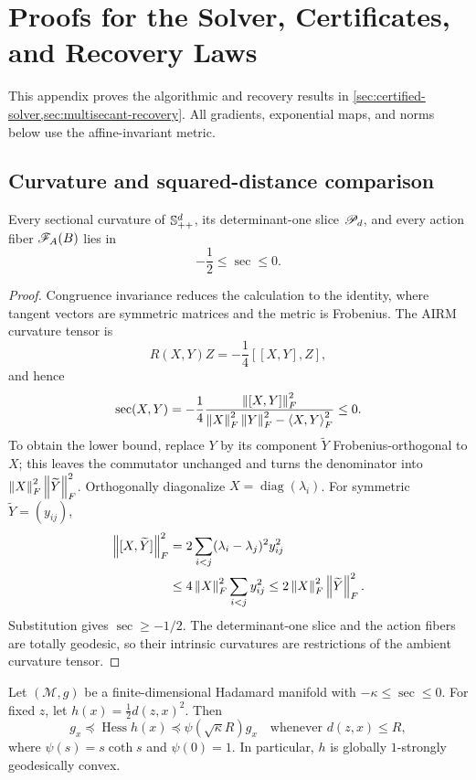 \section{Proofs for the Solver, Certificates, and Recovery Laws}
\label{app:solver-recovery-proofs}

This appendix proves the algorithmic and recovery results in
\cref{sec:certified-solver,sec:multisecant-recovery}.
All gradients, exponential maps, and norms below
use the affine-invariant metric.

\subsection{Curvature and squared-distance comparison}

\begin{lemma}
\label{lem:airm-curvature-bound}
Every sectional curvature of \(\mathbb{S}_{++}^d\), its determinant-one slice
\(\mathscr P_d\), and every action fiber \(\mathscr F_A(B)\) lies in
\begin{equation}
  -\frac12\le \operatorname{sec}\le0.
  \label{eq:airm-curvature-bound}
\end{equation}
\end{lemma}

\begin{proof}
Congruence invariance reduces the calculation to the identity, where tangent
vectors are symmetric matrices and the metric is Frobenius.  The AIRM
curvature tensor is
\[
  R(X,Y)Z=-\frac14[[X,Y],Z],
\]
and hence
\[
  \operatorname{sec}(X,Y)
  =-\frac14\frac{\left\lVert [X,Y]\right\rVert_F^2}
  {\left\lVert X\right\rVert_F^2\left\lVert Y\right\rVert_F^2-\left\langle X,Y\right\rangle_F^2}\le0.
\]
To obtain the lower bound, replace \(Y\) by its component
\(\widetilde Y\) Frobenius-orthogonal to \(X\); this leaves the commutator
unchanged and turns the denominator into
\(\left\lVert X\right\rVert_F^2\left\lVert \widetilde Y\right\rVert_F^2\).  Orthogonally diagonalize
\(X=\operatorname{diag}(\lambda_i)\).  For symmetric
\(\widetilde Y=(y_{ij})\),
\[
\begin{aligned}
  \left\lVert [X,\widetilde Y]\right\rVert_F^2
  &=2\sum_{i<j}(\lambda_i-\lambda_j)^2y_{ij}^2\\
  &\le4\left\lVert X\right\rVert_F^2\sum_{i<j}y_{ij}^2
  \le2\left\lVert X\right\rVert_F^2\left\lVert \widetilde Y\right\rVert_F^2.
\end{aligned}
\]
Substitution gives \(\operatorname{sec}\ge-1/2\).  The determinant-one
slice and the action fibers are totally geodesic, so their intrinsic
curvatures are restrictions of the ambient curvature tensor.
\end{proof}

\begin{lemma}
\label{lem:squared-distance-comparison}
Let \((\mathcal M,g)\) be a finite-dimensional Hadamard manifold with
\(-\kappa\le\operatorname{sec}\le0\).  For fixed \(z\), let
\(h(x)=\tfrac12d(z,x)^2\).  Then
\begin{equation}
  g_x\preceq\operatorname{Hess}h(x)
  \preceq\psi(\sqrt\kappa R)g_x
  \quad\text{whenever }d(z,x)\le R,
  \label{eq:squared-distance-comparison}
\end{equation}
where \(\psi(s)=s\coth s\) and \(\psi(0)=1\).  In particular, \(h\) is
globally \(1\)-strongly geodesically convex.
\end{lemma}

